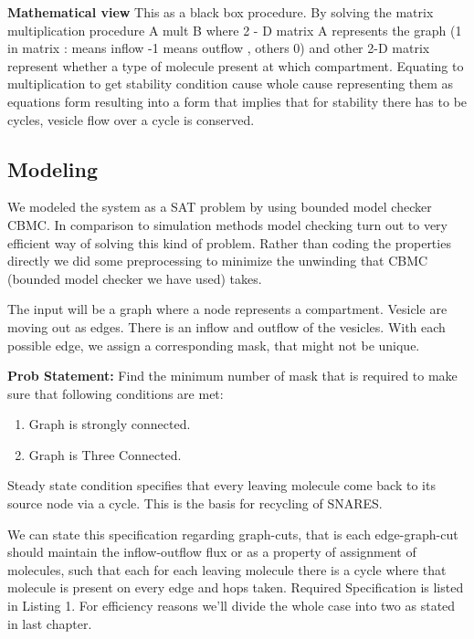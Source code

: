 \documentclass[preprint,12pt]{elsarticle}
\begin{document}
\textbf{Mathematical view} This as a black box procedure. By solving the matrix multiplication procedure A mult B  where 2 - D matrix A represents the graph (1 in matrix : means  inflow -1 means outflow , others 0) and other 2-D matrix represent whether a type of molecule present at which compartment. Equating to multiplication to get stability condition cause whole cause representing them as equations form resulting into a form that implies that for stability there has to be cycles, vesicle flow over a cycle is conserved. 


\subsection{Modeling}
We modeled the system as a SAT problem by using bounded model checker CBMC. In comparison to simulation methods model checking turn out to very efficient way of solving this kind of problem. Rather than coding the properties directly we did some preprocessing to minimize the unwinding that CBMC (bounded model checker we have used) takes. 

%
The input will be a graph where a node represents a compartment. Vesicle are moving out as edges. There is an inflow and outflow of the vesicles. With each possible edge, we assign a corresponding mask, that might not be unique. 

\textbf{Prob Statement:} Find the minimum number of mask that is required to make sure that following conditions are met:
\begin{enumerate}
\item Graph is strongly connected.
\item Graph is Three  Connected.
\end{enumerate}

Steady state condition specifies that every leaving molecule come back to its source node via a cycle. This is the basis for recycling of SNARES.

We can state this specification regarding graph-cuts, that is each edge-graph-cut should maintain the inflow-outflow flux or as a property of assignment of molecules, such that each for each leaving molecule there is a cycle where that molecule is present on every edge and hops taken. Required Specification is listed in Listing 1. For efficiency reasons we'll divide the whole case into two as stated in last chapter.
\end{document}
